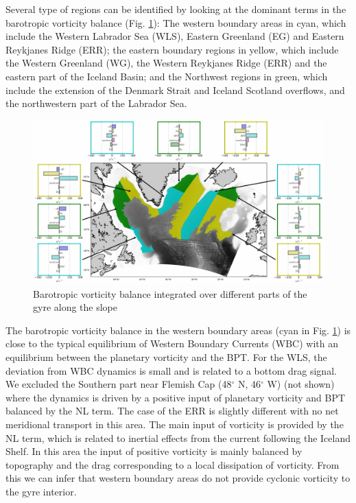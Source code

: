\documentclass[os, manuscript]{copernicus}
\begin{document}
Several type of regions can be identified by looking at the dominant terms in the barotropic vorticity balance  (Fig. \ref{f11}): The western boundary areas in cyan, which include the Western Labrador Sea (WLS), Eastern Greenland (EG) and Eastern Reykjanes Ridge (ERR); the eastern boundary regions in yellow, which include the Western Greenland (WG), the Western Reykjanes Ridge (ERR) and the eastern part of the Iceland Basin; and the Northwest regions in green, which include the extension of the Denmark Strait and Iceland Scotland overflows, and the northwestern part of the Labrador Sea.

\begin{figure}[t]
\includegraphics[width=15cm]{../fig_os/f11.pdf}
\caption{Barotropic vorticity balance integrated over different parts of the gyre along the slope}
\label{f11}
\end{figure}

The barotropic vorticity balance in the western boundary areas (cyan in Fig. \ref{f11}) is close to the typical equilibrium of Western Boundary Currents (WBC) \citep{schoonover2016,gula2015} with an equilibrium between the planetary vorticity and the BPT. For the WLS, the deviation from WBC dynamics is small and is related to a bottom drag signal. We excluded the Southern part near Flemish Cap (48$^{\circ}$ N, 46$^{\circ}$ W) (not shown) where the dynamics is driven by a positive input of planetary vorticity and BPT balanced by the NL term. The case of the ERR is slightly different with  no net meridional transport in this area. The main input of vorticity is provided by the NL term, which is related to inertial effects from the current following the Iceland Shelf. In this area the input of positive vorticity is mainly balanced by topography and the drag corresponding to a local dissipation of vorticity. From this we can infer that western boundary areas do not provide cyclonic vorticity to the gyre interior.
\end{document}
